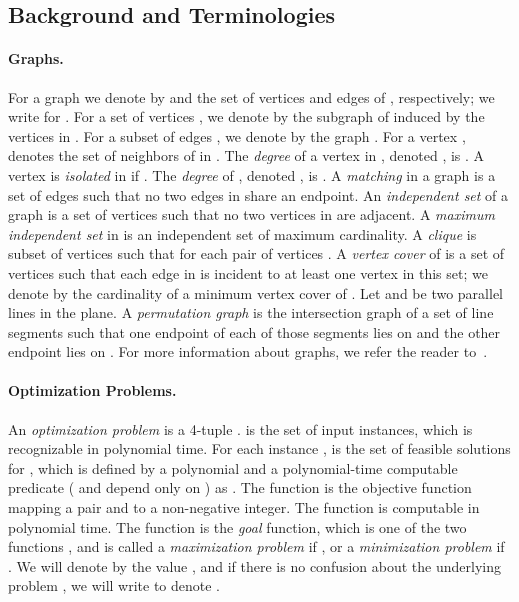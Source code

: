 \documentclass[11pt]{article}
\newcommand{\NP}{\mbox{}}
\begin{document}
\subsection{Background and Terminologies}\label{sec:background}
\paragraph{Graphs.} For a graph  we denote by  and  the set of vertices and edges of , respectively; we write  for .  For a set of vertices , we denote by  the subgraph of  induced by the vertices in . For a subset of edges , we denote by  the graph . For a vertex ,  denotes the set of neighbors of  in . The {\em degree} of a vertex  in , denoted , is .  A vertex  is {\em isolated} in  if . The {\em degree} of , denoted , is . A {\em matching} in a graph is a set of edges  such that no two edges in  share an endpoint. An {\em independent set} of a graph  is a set of vertices  such that no two vertices in  are adjacent.  A {\em maximum independent set} in  is an independent set of maximum cardinality.  A {\em clique} is subset of vertices  such that for each pair of vertices .  A {\em vertex cover} of  is a set of vertices such that each edge in  is incident to at least one vertex in this set; we denote by  the cardinality of a minimum vertex cover of . Let  and  be two parallel lines in the plane. A {\em permutation graph}  is the intersection graph of a set of line segments such that one endpoint of each of those segments lies on  and the other endpoint lies on . For more information about graphs, we refer the reader to~\cite{west}.

\paragraph{Optimization Problems.} An {\it \NP optimization problem}  is a 4-tuple .  is the set of input instances, which is recognizable in polynomial time. For each instance ,  is the set of feasible solutions for , which is defined by a polynomial  and a polynomial-time computable predicate  ( and  depend only on ) as . The function  is the objective function mapping a pair  and  to a non-negative integer.  The function  is computable in polynomial time. The function  is the {\em goal} function, which is one of the two functions , and  is called a {\it maximization problem} if , or a {\it minimization problem} if . We will denote by  the value , and if there is no confusion about the underlying problem , we will write  to denote .
\end{document}
